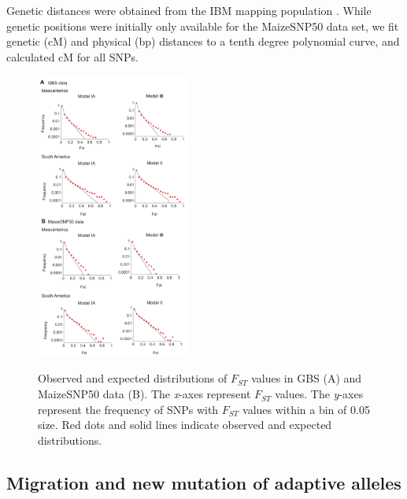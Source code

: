 Genetic distances were obtained from the IBM mapping population \cite[]{Ganal_2011_22174790}.  
While genetic positions were initially only available for the MaizeSNP50 data set, we fit genetic (cM) and physical (bp) distances to a tenth degree polynomial curve, and calculated cM for all SNPs. 
 

\begin{figure}[tb]   
  \begin{center}
   \vspace{-0mm}
   \includegraphics[width=0.45\textwidth]{fig/Fig5}
   \renewcommand{\baselinestretch}{0.9}
   \vspace{-3mm}
   \caption{Observed and expected distributions of $F_{ST}$ values in GBS (A) and MaizeSNP50 data (B).  The \emph{x}-axes represent $F_{ST}$ values.  The \emph{y}-axes represent the frequency of SNPs with $F_{ST}$ values within a bin of 0.05 size.  Red dots and solid lines indicate observed and expected distributions. 
   }
\vspace{-6mm}
    \label{FstDist}
  \end{center}
\end{figure}


\subsection*{Migration and new mutation of adaptive alleles}

